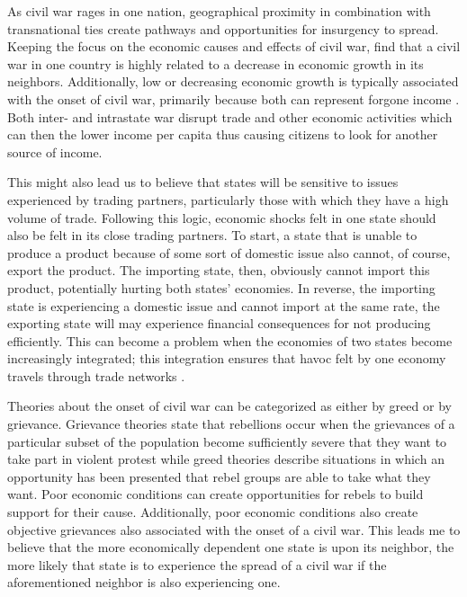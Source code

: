 \documentclass[12pt,letterpaper]{article}
\begin{document}
As civil war rages in one nation, geographical proximity in combination with transnational ties create pathways and opportunities for insurgency to spread. Keeping the focus on the economic causes and effects of civil war, \citet{MurdochSandler2002} find that a civil war in one country is highly related to a decrease in economic growth in its neighbors. Additionally, low or decreasing economic growth is typically associated with the onset of civil war, primarily because both can represent forgone income \citep{CollierHoeffler2004}. Both inter- and intrastate war disrupt trade and other economic activities which can then the lower income per capita thus causing citizens to look for another source of income. 

This might also lead us to believe that states will be sensitive to issues experienced by trading partners, particularly those with which they have a high volume of trade. Following this logic, economic shocks felt in one state should also be felt in its close trading partners. To start, a state that is unable to produce a product because of some sort of domestic issue also cannot, of course, export the product. The importing state, then, obviously cannot import this product, potentially hurting both states' economies. In reverse, the importing state is experiencing a domestic issue and cannot import at the same rate, the exporting state will may experience financial consequences for not producing efficiently. This can become a problem when the economies of two states become increasingly integrated; this integration ensures that havoc felt by one economy travels through trade networks \citep{Gartzke2007}.  

Theories about the onset of civil war can be categorized as either by greed or by grievance. Grievance theories state that rebellions occur when the grievances of a particular subset of the population become sufficiently severe that they want to take part in violent protest while greed theories describe situations in which an opportunity has been presented that rebel groups are able to take what they want. Poor economic conditions can create opportunities for rebels to build support for their cause. Additionally, poor economic conditions also create objective grievances also associated with the onset of a civil war. This leads me to believe that the more economically dependent one state is upon its neighbor, the more likely that state is to experience the spread of a civil war if the aforementioned neighbor is also experiencing one. 
\end{document}
